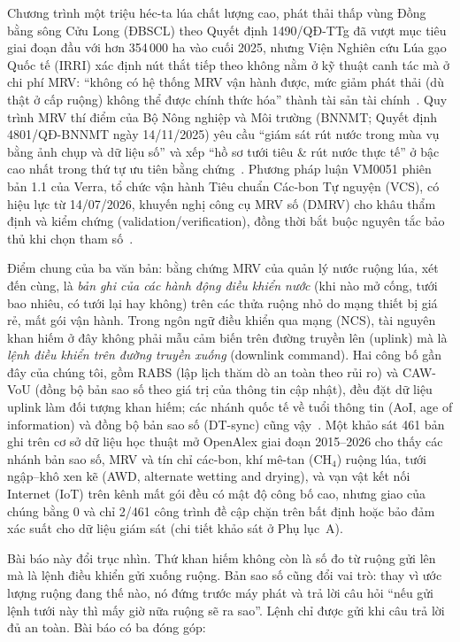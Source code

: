 \documentclass[10pt]{article}
\begin{document}
Chương trình một triệu héc-ta lúa chất lượng cao, phát thải thấp vùng Đồng bằng sông Cửu Long (ĐBSCL) theo Quyết định 1490/QĐ-TTg đã vượt mục tiêu giai đoạn đầu với hơn 354\,000 ha vào cuối 2025, nhưng Viện Nghiên cứu Lúa gạo Quốc tế (IRRI) xác định nút thắt tiếp theo không nằm ở kỹ thuật canh tác mà ở chi phí MRV: ``không có hệ thống MRV vận hành được, mức giảm phát thải (dù thật ở cấp ruộng) không thể được chính thức hóa'' thành tài sản tài chính~\cite{irri2026mrv,qd1490}. Quy trình MRV thí điểm của Bộ Nông nghiệp và Môi trường (BNNMT; Quyết định 4801/QĐ-BNNMT ngày 14/11/2025) yêu cầu ``giám sát rút nước trong mùa vụ bằng ảnh chụp và dữ liệu số'' và xếp ``hồ sơ tưới tiêu \& rút nước thực tế'' ở bậc cao nhất trong thứ tự ưu tiên bằng chứng~\cite{qd4801}. Phương pháp luận VM0051 phiên bản 1.1 của Verra, tổ chức vận hành Tiêu chuẩn Các-bon Tự nguyện (VCS), có hiệu lực từ 14/07/2026, khuyến nghị công cụ MRV số (DMRV) cho khâu thẩm định và kiểm chứng (validation/verification), đồng thời bắt buộc nguyên tắc bảo thủ khi chọn tham số~\cite{vm0051}.

Điểm chung của ba văn bản: bằng chứng MRV của quản lý nước ruộng lúa, xét đến cùng, là \emph{bản ghi của các hành động điều khiển nước} (khi nào mở cống, tưới bao nhiêu, có tưới lại hay không) trên các thửa ruộng nhỏ do mạng thiết bị giá rẻ, mất gói vận hành. Trong ngôn ngữ điều khiển qua mạng (NCS), tài nguyên khan hiếm ở đây không phải mẫu cảm biến trên đường truyền lên (uplink) mà là \emph{lệnh điều khiển trên đường truyền xuống} (downlink command). Hai công bố gần đây của chúng tôi, gồm RABS (lập lịch thăm dò an toàn theo rủi ro) và CAW-VoU (đồng bộ bản sao số theo giá trị của thông tin cập nhật), đều đặt dữ liệu uplink làm đối tượng khan hiếm; các nhánh quốc tế về tuổi thông tin (AoI, age of information) và đồng bộ bản sao số (DT-sync) cũng vậy~\cite{rabs,cawvou}. Một khảo sát 461 bản ghi trên cơ sở dữ liệu học thuật mở OpenAlex giai đoạn 2015--2026 cho thấy các nhánh bản sao số, MRV và tín chỉ các-bon, khí mê-tan (CH$_4$) ruộng lúa, tưới ngập--khô xen kẽ (AWD, alternate wetting and drying), và vạn vật kết nối Internet (IoT) trên kênh mất gói đều có mật độ công bố cao, nhưng giao của chúng bằng 0 và chỉ 2/461 công trình đề cập chặn trên bất định hoặc bảo đảm xác suất cho dữ liệu giám sát (chi tiết khảo sát ở Phụ lục~A).

Bài báo này đổi trục nhìn. Thứ khan hiếm không còn là số đo từ ruộng gửi lên mà là lệnh điều khiển gửi xuống ruộng. Bản sao số cũng đổi vai trò: thay vì ước lượng ruộng đang thế nào, nó đứng trước máy phát và trả lời câu hỏi ``nếu gửi lệnh tưới này thì mấy giờ nữa ruộng sẽ ra sao''. Lệnh chỉ được gửi khi câu trả lời đủ an toàn. Bài báo có ba đóng góp:
\end{document}
